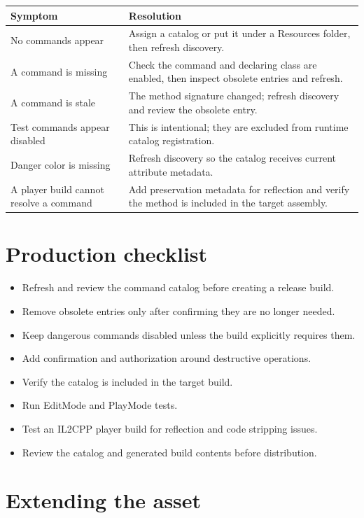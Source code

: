 \documentclass[11pt,a4paper]{article}
\begin{document}
\begin{longtable}{p{}p{}}
\toprule
\textbf{Symptom} & \textbf{Resolution} \\
\midrule
No commands appear & Assign a catalog or put it under a Resources folder, then refresh discovery. \\
A command is missing & Check the command and declaring class are enabled, then inspect obsolete entries and refresh. \\
A command is stale & The method signature changed; refresh discovery and review the obsolete entry. \\
Test commands appear disabled & This is intentional; they are excluded from runtime catalog registration. \\
Danger color is missing & Refresh discovery so the catalog receives current attribute metadata. \\
A player build cannot resolve a command & Add preservation metadata for reflection and verify the method is included in the target assembly. \\
\bottomrule
\end{longtable}

\section{Production checklist}

\begin{itemize}[leftmargin=*]
  \item Refresh and review the command catalog before creating a release build.
  \item Remove obsolete entries only after confirming they are no longer needed.
  \item Keep dangerous commands disabled unless the build explicitly requires them.
  \item Add confirmation and authorization around destructive operations.
  \item Verify the catalog is included in the target build.
  \item Run EditMode and PlayMode tests.
  \item Test an IL2CPP player build for reflection and code stripping issues.
  \item Review the catalog and generated build contents before distribution.
\end{itemize}

\section{Extending the asset}
\end{document}
